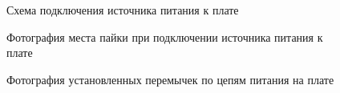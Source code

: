 

\label{appendix:power_adapter}

\begin{figure}[!h]
\caption{Схема подключения источника питания к плате \DocProductShortTitle~}
\label{ris:vim_power_connection}
\end{figure}

\begin{figure}[!h]
\caption{Фотография места пайки при подключении источника питания к плате \DocProductShortTitle~}
\label{ris:vim_vcc12_adapter_solder_foto}
\end{figure}


\label{appendix:power_jumpers}

\begin{figure}[!h]
\caption{Фотография установленных перемычек по цепям питания на плате \DocProductShortTitle~}
\label{ris:vim_power_jumper_foto}
\end{figure}




